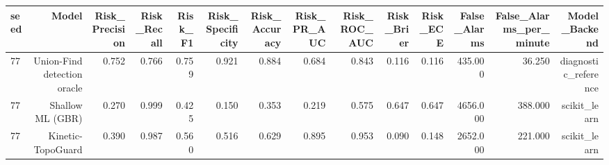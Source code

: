 \begin{tabular}{lrrrrrrrrrrrrr}
\toprule
seed & Model & Risk\_Precision & Risk\_Recall & Risk\_F1 & Risk\_Specificity & Risk\_Accuracy & Risk\_PR\_AUC & Risk\_ROC\_AUC & Risk\_Brier & Risk\_ECE & False\_Alarms & False\_Alarms\_per\_minute & Model\_Backend \\
\midrule
77 & Union-Find detection oracle & 0.752 & 0.766 & 0.759 & 0.921 & 0.884 & 0.684 & 0.843 & 0.116 & 0.116 & 435.000 & 36.250 & diagnostic\_reference \\
77 & Shallow ML (GBR) & 0.270 & 0.999 & 0.425 & 0.150 & 0.353 & 0.219 & 0.575 & 0.647 & 0.647 & 4656.000 & 388.000 & scikit\_learn \\
77 & Kinetic-TopoGuard & 0.390 & 0.987 & 0.560 & 0.516 & 0.629 & 0.895 & 0.953 & 0.090 & 0.148 & 2652.000 & 221.000 & scikit\_learn \\
\bottomrule
\end{tabular}